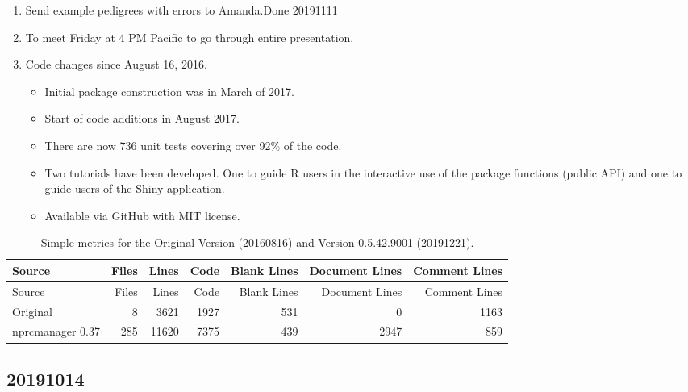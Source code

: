 \documentclass[
]{article}
\providecommand{\tightlist}{%
  \setlength{\itemsep}{0pt}\setlength{\parskip}{0pt}}
\begin{document}
\begin{enumerate}
\def\labelenumi{\arabic{enumi}.}
\tightlist
\item
  Send example pedigrees with errors to Amanda.Done 20191111
\item
  To meet Friday at 4 PM Pacific to go through entire presentation.
\item
  Code changes since August 16, 2016.

  \begin{itemize}
  \tightlist
  \item
    Initial package construction was in March of 2017.
  \item
    Start of code additions in August 2017.
  \item
    There are now 736 unit tests covering over 92\% of the code.
  \item
    Two tutorials have been developed. One to guide R users in the
    interactive use of the package functions (public API) and one to
    guide users of the Shiny application.
  \item
    Available via GitHub with MIT license.
  \end{itemize}
\end{enumerate}

\begin{longtable}[]{@{}lrrrrrr@{}}
\caption{Simple metrics for the Original Version (20160816) and Version
0.5.42.9001 (20191221).}\tabularnewline
\toprule
Source & Files & Lines & Code & Blank Lines & Document Lines & Comment
Lines\tabularnewline
\midrule
\endfirsthead
\toprule
Source & Files & Lines & Code & Blank Lines & Document Lines & Comment
Lines\tabularnewline
\midrule
\endhead
Original & 8 & 3621 & 1927 & 531 & 0 & 1163\tabularnewline
nprcmanager 0.37 & 285 & 11620 & 7375 & 439 & 2947 & 859\tabularnewline
\bottomrule
\end{longtable}

\hypertarget{section-6}{%
\subsection{20191014}\label{section-6}}
\end{document}

